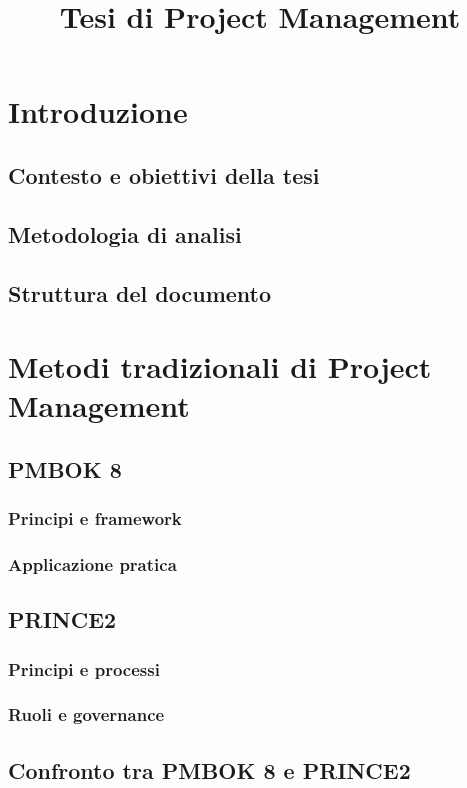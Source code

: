 \documentclass[12pt,a4paper]{article}
\title{Tesi di Project Management}
\author{}
\date{}
\begin{document}
\maketitle
\tableofcontents
\newpage

\section{Introduzione}
\subsection{Contesto e obiettivi della tesi}
\subsection{Metodologia di analisi}
\subsection{Struttura del documento}

\section{Metodi tradizionali di Project Management}
\subsection{PMBOK 8}
\subsubsection{Principi e framework}
\subsubsection{Applicazione pratica}
\subsection{PRINCE2}
\subsubsection{Principi e processi}
\subsubsection{Ruoli e governance}
\subsection{Confronto tra PMBOK 8 e PRINCE2}
\end{document}
